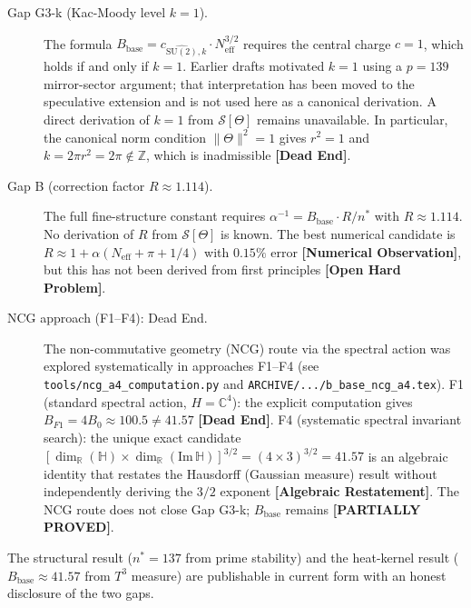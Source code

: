 \documentclass[11pt,a4paper]{article}
\theoremstyle{definition}
\theoremstyle{remark}
\newcommand{\PARTIAL}{\textbf{[PARTIALLY PROVED]}}
\begin{document}
\begin{description}
  \item[Gap G3-k (Kac-Moody level $k=1$).]
    The formula $B_{\mathrm{base}} = c_{\widehat{\mathrm{SU}(2)},k} \cdot N_{\mathrm{eff}}^{3/2}$
    requires the central charge $c = 1$, which holds if and only if $k = 1$.
    Earlier drafts motivated $k=1$ using a $p=139$ mirror-sector argument; that
    interpretation has been moved to the speculative extension and is not used
    here as a canonical derivation.  A direct derivation of $k = 1$ from
    $\mathcal{S}[\Theta]$ remains unavailable. In particular, the canonical
    norm condition $\|\Theta\|^2 = 1$ gives $r^2 = 1$ and
    $k = 2\pi r^2 = 2\pi \notin \mathbb{Z}$, which is inadmissible
    \textbf{[Dead End]}.

  \item[Gap B (correction factor $R \approx 1.114$).]
    The full fine-structure constant requires $\alpha^{-1} = B_{\mathrm{base}} \cdot R / n^*$
    with $R \approx 1.114$. No derivation of $R$ from $\mathcal{S}[\Theta]$ is known.
    The best numerical candidate is $R \approx 1 + \alpha(N_{\mathrm{eff}} + \pi + 1/4)$
    with $0.15\%$ error \textbf{[Numerical Observation]}, but this has not been
    derived from first principles \textbf{[Open Hard Problem]}.

  \item[NCG approach (F1--F4): Dead End.]
    The non-commutative geometry (NCG) route via the spectral action was explored
    systematically in approaches F1--F4 (see \texttt{tools/ncg\_a4\_computation.py}
    and \texttt{ARCHIVE/.../b\_base\_ncg\_a4.tex}).
    F1 (standard spectral action, $H = \mathbb{C}^4$): the explicit computation
    gives $B_{F1} = 4 B_0 \approx 100.5 \neq 41.57$ \textbf{[Dead End]}.
    F4 (systematic spectral invariant search): the unique exact candidate
    $[\dim_\mathbb{R}(\mathbb{H}) \times \dim_\mathbb{R}(\mathrm{Im}\,\mathbb{H})]^{3/2}
    = (4 \times 3)^{3/2} = 41.57$ is an algebraic identity that restates the
    Hausdorff (Gaussian measure) result without independently deriving the
    $3/2$ exponent \textbf{[Algebraic Restatement]}.
    The NCG route does not close Gap G3-k;
    $B_{\mathrm{base}}$ remains \PARTIAL.
\end{description}

The structural result ($n^* = 137$ from prime stability) and the heat-kernel
result ($B_{\mathrm{base}} \approx 41.57$ from $T^3$ measure) are publishable
in current form with an honest disclosure of the two gaps.
\end{document}
